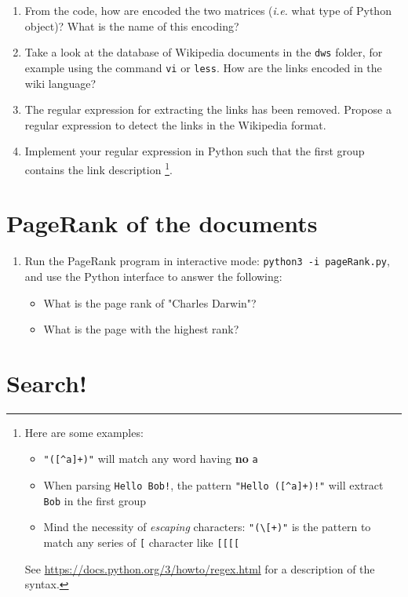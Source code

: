 \documentclass[mathserif, 11pt,c]{article}
\begin{document}
\begin{enumerate}[label=\textbf{Q\thesection.\arabic*}]
	\item From the code, how are encoded the two matrices (\textit{i.e.} what type of Python object)? What is the name of this encoding?
	\item Take a look at the database of Wikipedia documents in the \texttt{dws} folder, for example using the command \texttt{vi} or \texttt{less}. How are the links encoded in the wiki language?
	\item The regular expression for extracting the links has been removed. Propose a regular expression to detect the links in the Wikipedia format.
	\item Implement your regular expression in Python such that the first group contains the link description
	\footnote{Here are some examples: \begin{itemize}
		\item \texttt{"([\^{}a]+)"} will match any word having \textbf{no} \texttt{a}
		\item When parsing \texttt{Hello Bob!}, the pattern \texttt{"Hello ([\^{}a]+)!"} will extract \texttt{Bob} in the first group 
		\item Mind the necessity of \textit{escaping }characters: \texttt{"(\textbackslash [+)"} is the pattern to match any series of \texttt{[} character like \texttt{[[[[}
	\end{itemize} See \url{https://docs.python.org/3/howto/regex.html} for a description of the syntax.}.
\end{enumerate}


\section{PageRank of the documents}

\begin{enumerate}[label=\textbf{Q\thesection.\arabic*}]
	\item Run the PageRank program in interactive mode: \texttt{python3 -i pageRank.py}, and use the Python interface to answer the following:
	\begin{itemize}
		\item What is the page rank of "Charles Darwin"?
		\item What is the page with the highest rank?
	\end{itemize}
\end{enumerate}

\section{Search!}
\end{document}
